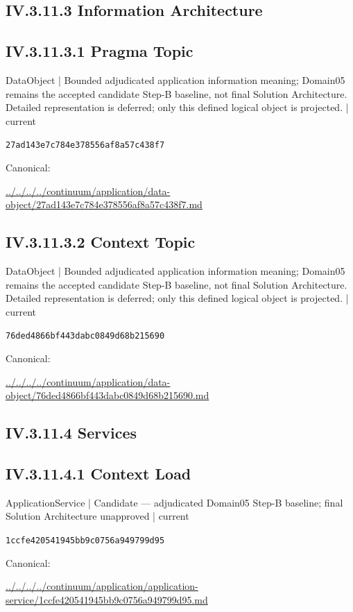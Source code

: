 \documentclass[10pt,a4paper]{article}
\begin{document}
\subsection*{IV.3.11.3 Information Architecture}
\subsection*{IV.3.11.3.1 Pragma Topic}
\label{element-27ad143e7c784e378556af8a57c438f7}
{\small DataObject | Bounded adjudicated application information meaning; Domain05 remains the accepted candidate Step-B baseline, not final Solution Architecture. Detailed representation is deferred; only this defined logical object is projected. | current}\par
\texttt{27ad143e7c784e378556af8a57c438f7}\par
Canonical: \par
{\footnotesize\url{../../../../continuum/application/data-object/27ad143e7c784e378556af8a57c438f7.md}}\par
\subsection*{IV.3.11.3.2 Context Topic}
\label{element-76ded4866bf443dabc0849d68b215690}
{\small DataObject | Bounded adjudicated application information meaning; Domain05 remains the accepted candidate Step-B baseline, not final Solution Architecture. Detailed representation is deferred; only this defined logical object is projected. | current}\par
\texttt{76ded4866bf443dabc0849d68b215690}\par
Canonical: \par
{\footnotesize\url{../../../../continuum/application/data-object/76ded4866bf443dabc0849d68b215690.md}}\par
\subsection*{IV.3.11.4 Services}
\subsection*{IV.3.11.4.1 Context Load}
\label{element-1ccfe420541945bb9c0756a949799d95}
{\small ApplicationService | Candidate — adjudicated Domain05 Step-B baseline; final Solution Architecture unapproved | current}\par
\texttt{1ccfe420541945bb9c0756a949799d95}\par
Canonical: \par
{\footnotesize\url{../../../../continuum/application/application-service/1ccfe420541945bb9c0756a949799d95.md}}\par
\end{document}
